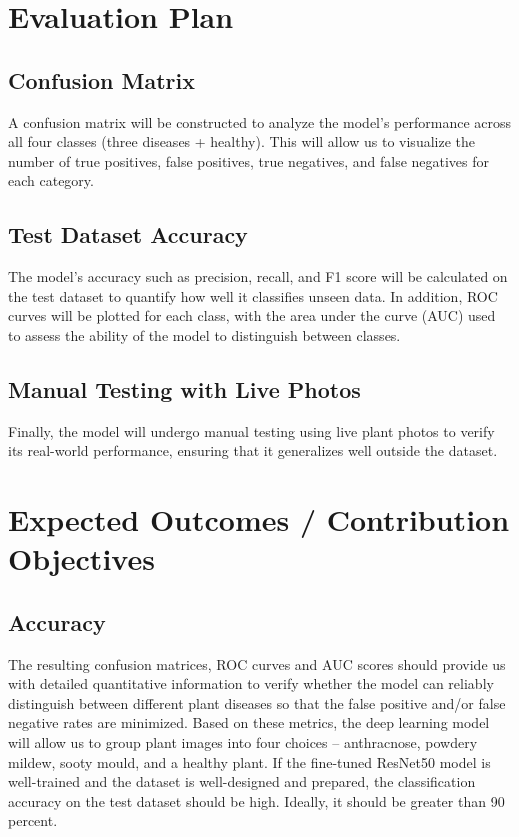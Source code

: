 \documentclass[12pt]{article}
\begin{document}
\section{Evaluation Plan}
\subsection{Confusion Matrix}
A confusion matrix will be constructed to analyze the model's performance across all four classes (three diseases + healthy). This will allow us to visualize the number of true positives, false positives, true negatives, and false negatives for each category.

\subsection{Test Dataset Accuracy}
The model's accuracy such as precision, recall, and F1 score will be calculated on the test dataset to quantify how well it classifies unseen data. In addition, ROC curves will be plotted for each class, with the area under the curve (AUC) used to assess the ability of the model to distinguish between classes.

\subsection{Manual Testing with Live Photos}
Finally, the model will undergo manual testing using live plant photos to verify its real-world performance, ensuring that it generalizes well outside the dataset.



\section{Expected Outcomes / Contribution Objectives}
\subsection{Accuracy}
The resulting confusion matrices, ROC curves and AUC scores should provide us with detailed quantitative information to verify whether the model can reliably distinguish between different plant diseases so that the false positive and/or false negative rates are minimized. Based on these metrics, the deep learning model will allow us to group plant images into four choices – anthracnose, powdery mildew, sooty mould, and a healthy plant. If the fine-tuned ResNet50 model is well-trained and the dataset is well-designed and prepared, the classification accuracy on the test dataset should be high. Ideally, it should be greater than 90 percent.
\end{document}
